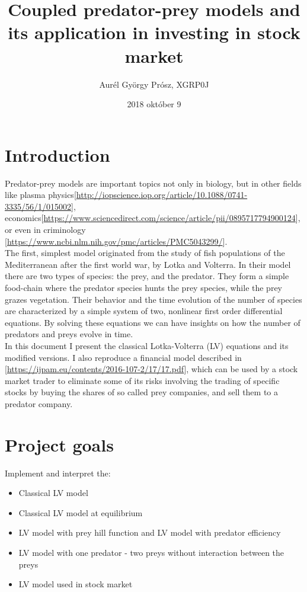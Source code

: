 \documentclass[]{article}
\title{Coupled predator-prey models and its application in investing in stock
market}
\author{Aurél György Prósz, XGRP0J}
\date{2018 október 9}
\providecommand{\tightlist}{%
  \setlength{\itemsep}{0pt}\setlength{\parskip}{0pt}}
\begin{document}
\maketitle

{
\setcounter{tocdepth}{2}
\tableofcontents
}
\section{Introduction}\label{introduction}

Predator-prey models are important topics not only in biology, but in
other fields like plasma
physics{[}\url{http://iopscience.iop.org/article/10.1088/0741-3335/56/1/015002}{]},
economics{[}\url{https://www.sciencedirect.com/science/article/pii/0895717794900124}{]},
or even in criminology
{[}\url{https://www.ncbi.nlm.nih.gov/pmc/articles/PMC5043299/}{]}.\\
The first, simplest model originated from the study of fish populations
of the Mediterranean after the first world war, by Lotka and Volterra.
In their model there are two types of species: the prey, and the
predator. They form a simple food-chain where the predator species hunts
the prey species, while the prey grazes vegetation. Their behavior and
the time evolution of the number of species are characterized by a
simple system of two, nonlinear first order differential equations. By
solving these equations we can have insights on how the number of
predators and preys evolve in time.\\
In this document I present the classical Lotka-Volterra (LV) equations
and its modified versions. I also reproduce a financial model described
in {[}\url{https://ijpam.eu/contents/2016-107-2/17/17.pdf}{]}, which can
be used by a stock market trader to eliminate some of its risks
involving the trading of specific stocks by buying the shares of so
called prey companies, and sell them to a predator company.

\section{Project goals}\label{project-goals}

Implement and interpret the:

\begin{itemize}
\tightlist
\item
  Classical LV model
\item
  Classical LV model at equilibrium
\item
  LV model with prey hill function and LV model with predator efficiency
\item
  LV model with one predator - two preys without interaction between the
  preys
\item
  LV model used in stock market
\end{itemize}
\end{document}
